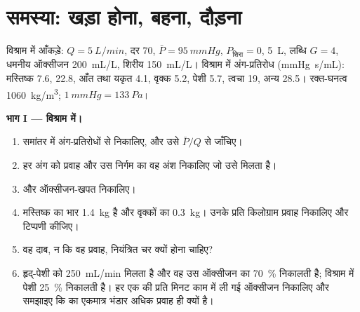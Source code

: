 \section{समस्या: खड़ा होना, बहना, दौड़ना}

\begin{problem}
\label{pb:b2:blood-pressure:1}
विश्राम में आँकड़े: $Q = \qty{5}{L/min}$, दर 70, $\bar P = \qty{95}{mmHg}$,
$P_{\text{शिरा}} = 0$,  \qty{5}{L},  लब्धि $G = 4$,
धमनीय ऑक्सीजन \qty{200}{mL/L}, शिरीय \qty{150}{mL/L}। विश्राम में
अंग-प्रतिरोध (\unit{mmHg.s/mL}): मस्तिष्क 7.6,  22.8, आँत
तथा यकृत 4.1, वृक्क 5.2, पेशी 5.7, त्वचा 19, अन्य 28.5।
रक्त-घनत्व \qty{1060}{kg/m^3}; $\qty{1}{mmHg} = \qty{133}{Pa}$।

\medskip
\noindent\textbf{भाग I --- विश्राम में।}
\begin{enumerate}
  \item समांतर में अंग-प्रतिरोधों से 
        निकालिए, और उसे $\bar P/Q$ से जाँचिए।
  \item हर अंग को प्रवाह और उस निर्गम का वह अंश
        निकालिए जो उसे मिलता है।
  \item {} और ऑक्सीजन-खपत निकालिए।
  \item मस्तिष्क का भार \qty{1.4}{kg} है और वृक्कों का \qty{0.3}{kg}।
        उनके प्रति किलोग्राम प्रवाह निकालिए और टिप्पणी कीजिए।
  \item वह दाब, न कि वह प्रवाह, नियंत्रित चर क्यों होना
        चाहिए?
  \item हृद्-पेशी को \qty{250}{mL/min} मिलता है और वह उस ऑक्सीजन का
        \qty{70}{\%} निकालती है; विश्राम में पेशी
        \qty{25}{\%} निकालती है। हर एक की प्रति मिनट काम में ली गई ऑक्सीजन निकालिए और
        समझाइए कि  का एकमात्र भंडार अधिक प्रवाह ही क्यों है।
\end{enumerate}


\end{problem}
